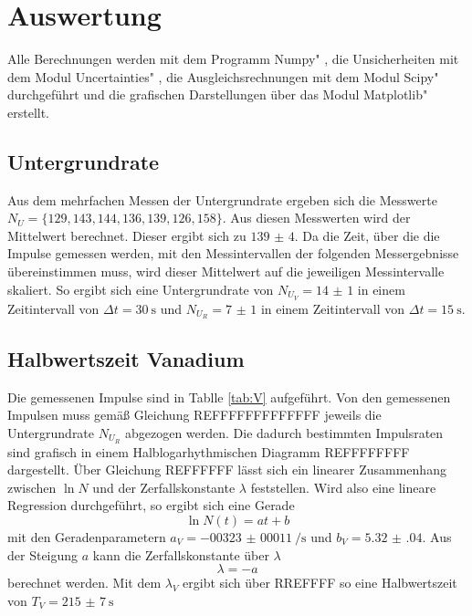 \section{Auswertung}
\label{sec:Auswertung}

Alle Berechnungen werden mit dem Programm \glqq Numpy" \cite{numpy}, die Unsicherheiten mit dem Modul \glqq Uncertainties" \cite{uncertainties}, die Ausgleichsrechnungen mit dem Modul \glqq Scipy" \cite{scipy} durchgeführt und die grafischen Darstellungen über das Modul \glqq Matplotlib" \cite{matplotlib} erstellt.

\subsection{Untergrundrate}

Aus dem mehrfachen Messen der Untergrundrate ergeben sich die Messwerte $N_U=\{ 129, 143, 144, 136, 139, 126, 158 \}$. Aus diesen Messwerten wird der Mittelwert berechnet. Dieser ergibt sich zu $\num{139(4)}$. Da die Zeit, über die die Impulse gemessen werden, mit den Messintervallen der folgenden Messergebnisse übereinstimmen muss, wird  dieser Mittelwert auf die jeweiligen Messintervalle skaliert. So ergibt sich eine Untergrundrate von $N_{U_V}=\num{14(1)}$ in einem Zeitintervall von $\Delta t=\SI{30}{\s}$ und $N_{U_R}=\num{7(1)}$ in einem Zeitintervall von $\Delta t=\SI{15}{\s}$.

\subsection{Halbwertszeit Vanadium}

Die gemessenen Impulse sind in Tablle \ref{tab:V} aufgeführt. Von den gemessenen Impulsen muss gemäß Gleichung REFFFFFFFFFFFFF jeweils die Untergrundrate $N_{U_R}$ abgezogen werden. Die dadurch bestimmten Impulsraten sind grafisch in einem Halblogarhythmischen Diagramm REFFFFFFFF dargestellt. Über Gleichung REFFFFFF lässt sich ein linearer Zusammenhang zwischen $\ln{N}$ und der Zerfallskonstante $\lambda $ feststellen. Wird also eine lineare Regression durchgeführt, so ergibt sich eine Gerade
\begin{equation}
    \ln{N}(t)=at + b
    \label{eqn:gerade}
\end{equation}
mit den Geradenparametern $a_V=\SI[per-mode=reciprocal]{-00323(00011)}{\per\s}$ und $b_V=\num{5.32(04)}$. 
Aus der Steigung $a$ kann die Zerfallskonstante über $\lambda$
\begin{equation}
    \lambda=-a
\label{eqn:lamb}
\end{equation}
berechnet werden. Mit dem $\lambda_V$ ergibt sich über RREFFFF so eine Halbwertszeit von $T_V=\SI{215(7)}{\s}$


